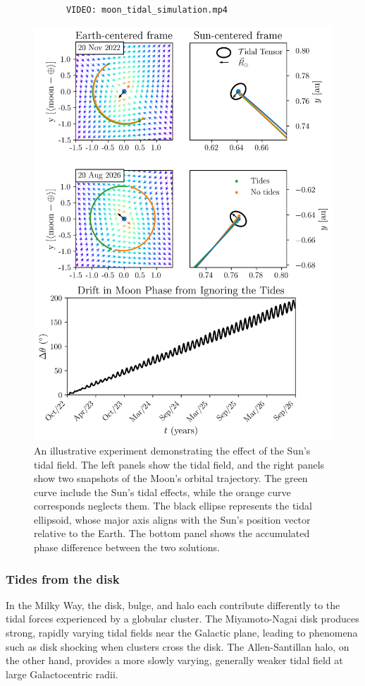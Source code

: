            \begin{verbatim}
            VIDEO: moon_tidal_simulation.mp4
            \end{verbatim}

            \begin{figure}
                \centering
                \includegraphics[width=.8\linewidth]{images/moon_tidal_simulation.png}
                \caption[Solar tides on the lunar orbit]{An illustrative experiment demonstrating the effect of the Sun's tidal field. The left panels show the tidal field, and the right panels show two snapshots of the Moon's orbital trajectory. The green curve include the Sun's tidal effects, while the orange curve corresponds neglects them. The black ellipse represents the tidal ellipsoid, whose major axis aligns with the Sun's position vector relative to the Earth. The bottom panel shows the accumulated phase difference between the two solutions. }\label{fig:moon_tidal_simulation}
            \end{figure}

        \subsubsection{Tides from the disk}
            In the Milky Way, the disk, bulge, and halo each contribute differently to the tidal forces experienced by a globular cluster. The Miyamoto-Nagai disk produces strong, rapidly varying tidal fields near the Galactic plane, leading to phenomena such as disk shocking when clusters cross the disk. The Allen-Santillan halo, on the other hand, provides a more slowly varying, generally weaker tidal field at large Galactocentric radii.

